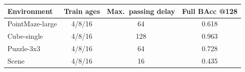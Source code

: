 \begin{tabular}{lccc}
\toprule
Environment & Train ages & Max.\ passing delay & Full BAcc @128\\
\midrule
PointMaze-large & 4/8/16 & 64 & 0.618\\
Cube-single & 4/8/16 & 128 & 0.963\\
Puzzle-3x3 & 4/8/16 & 64 & 0.728\\
Scene & 4/8/16 & 16 & 0.435\\
\bottomrule
\end{tabular}
